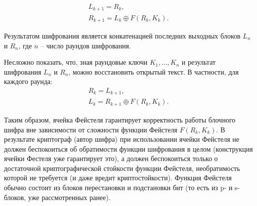 \[\begin{array}{l}
    L_{k+1} = R_{k}, \\
    R_{k+1} = L_{k} \oplus F\left( R_k, K_k \right).
\end{array}\]

Результатом шифрования является конкатенацией последних выходных блоков $L_n$ и $R_n$, где $n$ -- число раундов шифрования.

Несложно показать, что, зная раундовые ключи $K_1, \dots, K_n$ и результат шифрования $L_n$ и $R_n$, можно восстановить открытый текст. В частности, для каждого раунда:
\[\begin{array}{l}
    R_k = L_{k+1}, \\
    L_k = R_{k+1} \oplus F\left( R_k, K_k \right).
\end{array}\]

Таким образом, ячейка Фейстеля гарантирует корректность работы блочного шифра вне зависимости от сложности функции Фейстеля $F\left(R_k, K_k \right)$. В результате криптограф (автор шифра) при использовании ячейки Фейстеля не должен беспокоиться об обратимости функции шифрования в целом (конструкция ячейки Фестеля уже гарантирует это), а должен беспокоиться только о достаточной криптографической стойкости функции Фейстеля, необратимость которой не требуется (и даже вредит криптостойкости). Функция Фейстеля обычно состоит из блоков перестановки и подстановки бит (то есть из p- и s-блоков, уже рассмотренных ранее).

